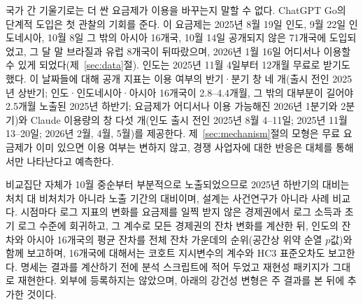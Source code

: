 \documentclass[11pt]{article}
\theoremstyle{definition}
\theoremstyle{remark}
\begin{document}
국가 간 기울기로는 더 싼 요금제가 이용을 바꾸는지 말할 수 없다. ChatGPT Go의 단계적 도입은 첫 관찰의 기회를 준다. 이 요금제는 2025년 8월 19일 인도, 9월 22일 인도네시아, 10월 8일 그 밖의 아시아 16개국, 10월 14일 공개되지 않은 71개국에 도입되었고, 그 달 말 브라질과 유럽 8개국이 뒤따랐으며, 2026년 1월 16일 어디서나 이용할 수 있게 되었다(제~\ref{sec:data}절). 인도는 2025년 11월 4일부터 12개월 무료로 받기도 했다. 이 날짜들에 대해 공개 지표는 이용 여부의 반기·분기 창 네 개(출시 전인 2025년 상반기; 인도·인도네시아·아시아 16개국이 2.8--4.4개월, 그 밖의 대부분이 길어야 2.5개월 노출된 2025년 하반기; 요금제가 어디서나 이용 가능해진 2026년 1분기와 2분기)와 Claude 이용량의 창 다섯 개(인도 출시 전인 2025년 8월 4--11일; 2025년 11월 13--20일; 2026년 2월, 4월, 5월)를 제공한다. 제~\ref{sec:mechanism}절의 모형은 무료 요금제가 이미 있으면 이용 여부는 변하지 않고, 경쟁 사업자에 대한 반응은 대체를 통해서만 나타난다고 예측한다.

비교집단 자체가 10월 중순부터 부분적으로 노출되었으므로 2025년 하반기의 대비는 처치 대 비처치가 아니라 노출 기간의 대비이며, 설계는 사건연구가 아니라 사례 비교다. 시점마다 로그 지표의 변화를 요금제를 일찍 받지 않은 경제권에서 로그 소득과 초기 로그 수준에 회귀하고, 그 계수로 모든 경제권의 잔차 변화를 계산한 뒤, 인도의 잔차와 아시아 16개국의 평균 잔차를 전체 잔차 가운데의 순위(공간상 위약 순열 $p$값)와 함께 보고하며, 16개국에 대해서는 코호트 지시변수의 계수와 HC3 표준오차도 보고한다. 명세는 결과를 계산하기 전에 분석 스크립트에 적어 두었고 재현성 패키지가 그대로 재현한다. 외부에 등록하지는 않았으며, 아래의 강건성 변형은 주 결과를 본 뒤에 추가한 것이다.
\end{document}
